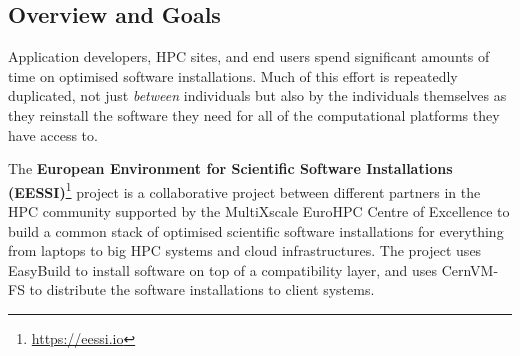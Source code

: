 

\subsection*{Overview and Goals}

Application developers, HPC sites, and end users %
spend significant amounts of time on optimised software installations.
Much of this effort is repeatedly duplicated, not just \emph{between}
individuals but also by the individuals themselves as they reinstall
the software they need for all of the computational platforms they have access to. 

The \textbf{European Environment for Scientific Software Installations
(EESSI)}\footnote{\href{https://eessi.io}{https://eessi.io}} project is a collaborative project
between different partners in the HPC community supported by the MultiXscale EuroHPC Centre of Excellence to build a
common stack of optimised scientific software installations for everything from laptops to big HPC systems and cloud
infrastructures. The project uses EasyBuild to install software on top of a compatibility layer, and uses CernVM-FS to
distribute the software installations to client systems.

